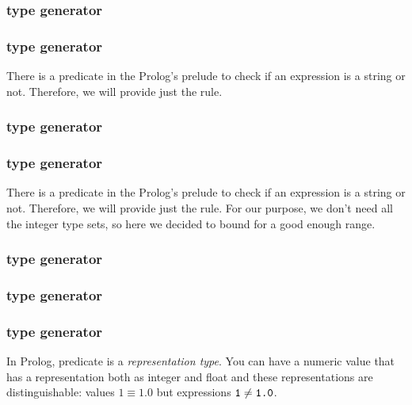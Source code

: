 \subsubsection{ type generator}

\subsubsection{ type generator}
There is a predicate  in the Prolog's prelude to check if an expression is a string or not. Therefore, we will provide just the  rule.

\subsubsection{ type generator}

\subsubsection{ type generator}
There is a predicate  in the Prolog's prelude to check if an expression is a string or not. Therefore, we will provide just the  rule. For our purpose, we don't need all the integer type sets, so here we decided to bound for a good enough range.

\subsubsection{ type generator}

\subsubsection{ type generator}

\subsubsection{ type generator}
In Prolog,  predicate is a \textit{representation type}. You can have a numeric value that has a representation both as integer and float and these representations are distinguishable: values $1 \equiv 1.0$ but expressions $\texttt{1} \neq \texttt{1.0}$.

